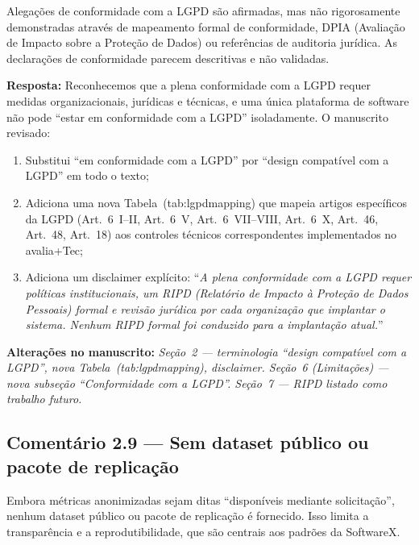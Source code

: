 \documentclass[11pt,a4paper]{article}
\newcommand{\response}[1]{\par\noindent\textcolor{responsecolor}{\textbf{Resposta:}} #1}
\newcommand{\change}[1]{\par\noindent\textcolor{changecolor}{\textbf{Alterações no manuscrito:}} \textit{#1}}
\begin{document}
\begin{reviewerbox}
Alegações de conformidade com a LGPD são afirmadas, mas não rigorosamente demonstradas através de mapeamento formal de conformidade, DPIA (Avaliação de Impacto sobre a Proteção de Dados) ou referências de auditoria jurídica. As declarações de conformidade parecem descritivas e não validadas.
\end{reviewerbox}

\response{Reconhecemos que a plena conformidade com a LGPD requer medidas organizacionais, jurídicas e técnicas, e uma única plataforma de software não pode ``estar em conformidade com a LGPD'' isoladamente. O manuscrito revisado:}

\begin{enumerate}[nosep]
  \item Substitui ``em conformidade com a LGPD'' por ``design compatível com a LGPD'' em todo o texto;
  \item Adiciona uma nova Tabela~(tab:lgpdmapping) que mapeia artigos específicos da LGPD (Art.~6~I--II, Art.~6~V, Art.~6~VII--VIII, Art.~6~X, Art.~46, Art.~48, Art.~18) aos controles técnicos correspondentes implementados no avalia+Tec;
  \item Adiciona um disclaimer explícito: ``\textit{A plena conformidade com a LGPD requer políticas institucionais, um RIPD (Relatório de Impacto à Proteção de Dados Pessoais) formal e revisão jurídica por cada organização que implantar o sistema. Nenhum RIPD formal foi conduzido para a implantação atual.}''
\end{enumerate}

\change{Seção~2 --- terminologia ``design compatível com a LGPD'', nova Tabela~(tab:lgpdmapping), disclaimer. Seção~6 (Limitações) --- nova subseção ``Conformidade com a LGPD''. Seção~7 --- RIPD listado como trabalho futuro.}

\bigskip

\subsection*{Comentário 2.9 --- Sem dataset público ou pacote de replicação}

\begin{reviewerbox}
Embora métricas anonimizadas sejam ditas ``disponíveis mediante solicitação'', nenhum dataset público ou pacote de replicação é fornecido. Isso limita a transparência e a reprodutibilidade, que são centrais aos padrões da SoftwareX.
\end{reviewerbox}
\end{document}
